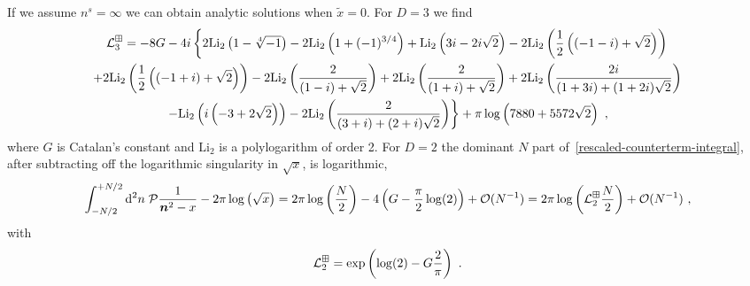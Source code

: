 If we assume $n^{s}=\infty$ we can obtain analytic solutions when $\tilde x=0$.  For $D=3$ we find
\begin{multline}
\mathcal{L}_3^{\boxplus}=-8 G-4 i \left\{2 \text{Li}_2\left(1-\sqrt[4]{-1}\right)-2 \text{Li}_2\left(1+(-1)^{3/4}\right)+\text{Li}_2\left(3 i-2 i
   \sqrt{2}\right)-2 \text{Li}_2\left(\frac{1}{2} \left((-1-i)+\sqrt{2}\right)\right)\right.\\
   \left.+2 \text{Li}_2\left(\frac{1}{2}
   \left((-1+i)+\sqrt{2}\right)\right)-2 \text{Li}_2\left(\frac{2}{(1-i)+\sqrt{2}}\right)+2
   \text{Li}_2\left(\frac{2}{(1+i)+\sqrt{2}}\right)+2 \text{Li}_2\left(\frac{2 i}{(1+3 i)+(1+2 i)
   \sqrt{2}}\right)\right.\\
   \left.-\text{Li}_2\left(i \left(-3+2 \sqrt{2}\right)\right)-2 \text{Li}_2\left(\frac{2}{(3+i)+(2+i)
   \sqrt{2}}\right)\right\}+\pi  \log \left(7880+5572 \sqrt{2}\right)\ ,
   \end{multline}
where $G$ is Catalan's constant and $\text{Li}_2$ is a polylogarithm of order 2.  For $D=2$ the dominant $N$ part of~\eqref{rescaled-counterterm-integral}, after subtracting off the logarithmic singularity in $\sqrt{x}$, is logarithmic,
\begin{equation}
 \int_{-N/2}^{+N/2} \mathrm{d}^2n\; \PV \frac{1}{\bm n^2 - x}-2\pi\log\left(\sqrt{x}\right)= 2\pi\log\left(\frac{N}{2}\right)-4\left(G-\frac{\pi }{2}\log(2)\right)+\mathcal{O}(N^{-1})=2\pi\log\left(\counterterm_2^{\dispersion}\frac{N}{2}\right)+\mathcal{O}(N^{-1})\ ,
\end{equation}
with
\begin{equation}
\counterterm_2^\dispersion=\exp\left(\log(2)-G\frac{2}{\pi}\right)\ .
\end{equation}
